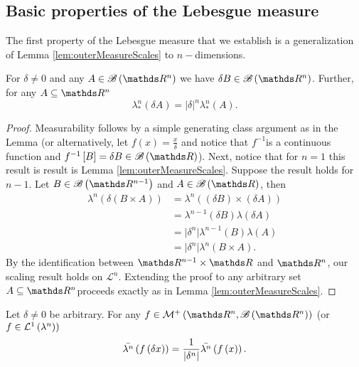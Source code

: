 \subsection{Basic properties of the Lebesgue measure\label{subsec:lebesgueRNproperties}}

The first property of the Lebesgue measure that we establish is a
generalization of Lemma \ref{lem:outerMeasureScales} to $n-$dimensions.
\begin{prop}
\label{prop:outerMeasureScalesNDim}For $\delta\neq0$ and any $A\in\borel\left(\R^{n}\right)$
we have $\delta B\in\borel\left(\R^{n}\right)$. Further, for any
$A\subseteq\R^{n}$
\[
\lambda_{*}^{n}\left(\delta A\right)=\lvert\delta\rvert^{n}\lambda_{*}^{n}\left(A\right).
\]
\end{prop}

\begin{proof}
Measurability follows by a simple generating class argument as in
the Lemma (or alternatively, let $f\left(x\right)=\frac{x}{\delta}$
and notice that $f^{-1}$is a continuous function and $f^{-1}\left[B\right]=\delta B\in\borel\left(\R\right)$).
Next, notice that for $n=1$ this result is result is Lemma \ref{lem:outerMeasureScales}.
Suppose the result holds for $n-1$. Let $B\in\borel\left(\R^{n-1}\right)$
and $A\in\borel\left(\R\right)$, then 
\begin{align*}
\lambda^{n}\left(\delta\left(B\times A\right)\right) & =\lambda^{n}\left(\left(\delta B\right)\times\left(\delta A\right)\right)\\
 & =\lambda^{n-1}\left(\delta B\right)\lambda\left(\delta A\right)\\
 & =\lvert\delta^{n}\rvert\lambda^{n-1}\left(B\right)\lambda\left(A\right)\\
 & =\lvert\delta^{n}\rvert\lambda^{n}\left(B\times A\right).
\end{align*}
By the identification between $\R^{n-1}\times\R$ and $\R^{n}$, our
scaling result holds on $\mathcal{L}^{n}$. Extending the proof to
any arbitrary set $A\subseteq\R^{n}$proceeds exactly as in Lemma
\ref{lem:outerMeasureScales}.
\end{proof}
\begin{cor}
\label{cor:dilationIntegral}Let $\delta\neq0$ be arbitrary. For
any $f\in\mathcal{M}^{+}\left(\R^{n},\borel\left(\R^{n}\right)\right)$
(or $f\in\mathcal{L}^{1}\left(\lambda^{n}\right))$
\[
\bar{\lambda^{n}}\left(f\left(\delta x\right)\right)=\frac{1}{\lvert\delta^{n}\rvert}\bar{\lambda^{n}}\left(f\left(x\right)\right).
\]
\end{cor}

